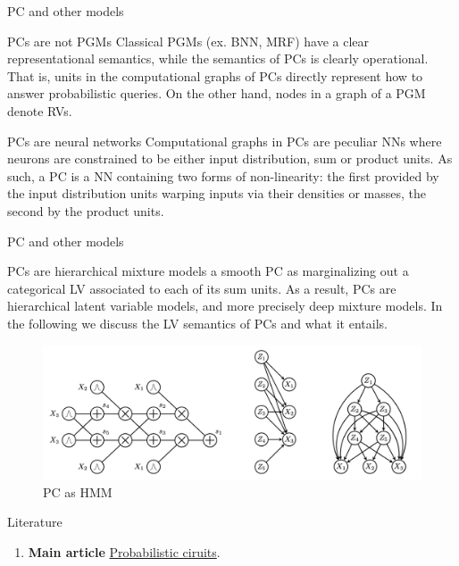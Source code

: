 \documentclass{beamer}
\begin{document}
\begin{frame}{PC and other models}
    \begin{block}{PCs are not PGMs}
        Classical PGMs (ex. BNN, MRF) have a clear representational semantics, while
        the semantics of PCs is clearly operational.
        That is, units in the computational graphs of
        PCs directly represent how
        to answer probabilistic queries. On the other hand, nodes in a graph of a PGM denote RVs.
    \end{block}

    \begin{block}{PCs are neural networks}
        Computational graphs in PCs are peculiar NNs where neurons are constrained
        to be either input distribution, sum or product units. As such, a PC is a NN containing two forms of non-linearity: the first provided by the
        input distribution units warping inputs via their densities or masses, the second by the
        product units.
    \end{block}
\end{frame}
\begin{frame}{PC and other models}
    \begin{block}{PCs are hierarchical mixture models}
        a smooth PC as marginalizing out a categorical LV
        associated to each of its sum units. As a result, PCs are hierarchical latent variable models,
        and more precisely deep mixture models. In the following we discuss the LV semantics of
        PCs and what it entails.
    \end{block}
    \begin{figure}
        \centering
        \includegraphics[width=0.8\linewidth]{trd.png}
        \caption{PC as HMM}
        \label{fig:pc-as-hmm}
    \end{figure}
\end{frame}

\begin{frame}{Literature}
    \begin{enumerate}
        \item \textbf{Main article} \href{http://starai.cs.ucla.edu/papers/ProbCirc20.pdf}
        {Probabilistic ciruits}.
    \end{enumerate}
\end{frame}
\end{document}
